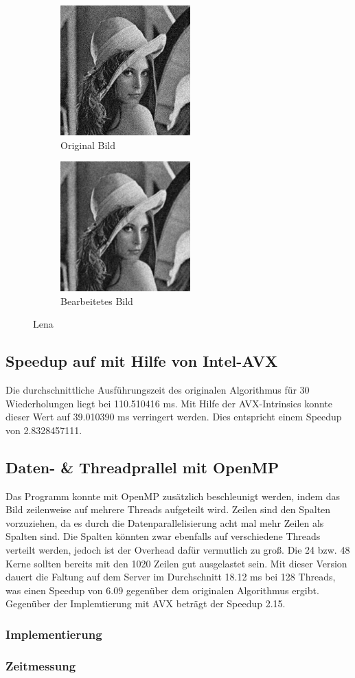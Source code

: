 \documentclass[12pt,a4paper]{article}
\begin{document}
\begin{figure}[h]
  \begin{subfigure}{0.5\textwidth}
    \includegraphics[width=0.9\linewidth, height=5cm]{../lena.jpg}
    \caption{Original Bild}
    \label{fig:subim2}
  \end{subfigure}
  \begin{subfigure}{0.5\textwidth}
    \includegraphics[width=0.9\linewidth, height=5cm]{../lenaout.jpg}
    \caption{Bearbeitetes Bild}
    \label{fig:subim1}
  \end{subfigure}
  \caption{Lena}
  \label{fig:image2}
\end{figure}

\subsection{Speedup auf mit Hilfe von Intel-AVX}
Die durchschnittliche Ausführungszeit des originalen Algorithmus für 30 Wiederholungen liegt bei 110.510416 ms. Mit Hilfe der AVX-Intrinsics konnte dieser Wert auf 39.010390 ms verringert werden. Dies entspricht einem Speedup von 2.8328457111.
\subsection{Daten- \& Threadprallel mit OpenMP}
Das Programm konnte mit OpenMP zusätzlich beschleunigt werden, indem das Bild zeilenweise auf mehrere Threads aufgeteilt wird. Zeilen sind den Spalten vorzuziehen, da es durch die Datenparallelisierung acht mal mehr Zeilen als Spalten sind. Die Spalten könnten zwar ebenfalls auf verschiedene Threads verteilt werden, jedoch ist der Overhead dafür vermutlich zu groß. Die 24 bzw. 48 Kerne sollten bereits mit den 1020 Zeilen gut ausgelastet sein. Mit dieser Version dauert die Faltung auf dem Server im Durchschnitt 18.12 ms bei 128 Threads, was einen Speedup von 6.09 gegenüber dem originalen Algorithmus ergibt. Gegenüber der Implemtierung mit AVX beträgt der Speedup 2.15.
\subsubsection{Implementierung}

\subsubsection{Zeitmessung}

\end{document}
